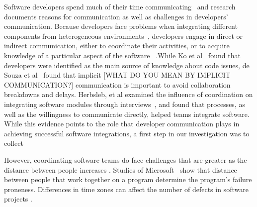 

Software developers spend much of their time
communicating~\cite{perry94} and research documents reasons for communication as well as challenges in developers' communication. Because developers face
problems when integrating different components from heterogeneous environments~\cite{redmiles2007:continuous},
developers engage in direct or indirect
communication, either to coordinate their activities, or to acquire knowledge of
a particular aspect of the software ~\cite{nakakoji2010:rdc}.While Ko et al~\cite{ko:icse:2007} found that developers were identified as the main source of knowledge about code issues, de Souza et al~\cite{desouza2007:awarenessnetwork} found that implicit [WHAT DO YOU MEAN BY IMPLICIT COMMUNICATION?]
communication is important to avoid collaboration breakdowns and delays.
Herbsleb, et al examined the influence of coordination on integrating software
modules through interviews~\cite{herbsleb1999:architectures}, and found that
processes, as well as the willingness to communicate directly, helped teams
integrate software. While this evidence points to the role that developer communication plays in achieving successful software integrations, a first step in our investigation was to collect 

However, coordinating software teams do face challenges that are greater as the distance between people increases \cite{herbsleb:icse:2001}.
Studies of Microsoft~\cite{bird2009:dds_quality,nagappan:icse:2008}
show that distance between people that work together on a
program determine the program's failure proneness.
Differences in time zones can affect the number of defects in software projects \cite{cataldo2009:quality}.

